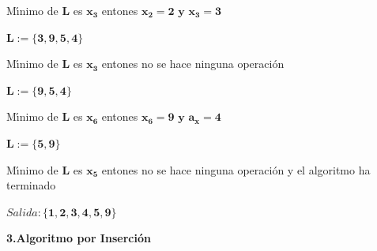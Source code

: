 \documentclass[ebook,oneside]{memoir}
\newcommand{\bolds}[1]{\boldsymbol{#1}}
\begin{document}
        \vspace*{0.5cm}

        \begin{minipage}{.6\textwidth}
        M\'{\i}nimo de $\bolds{L}$ es $\bolds{x_3}$ entones $\bolds{x_2=2
        \mbox{ y } x_3=3}$
        \end{minipage}\hfill
        \begin{minipage}{.3\textwidth}
        $\bolds{L:=\{3,9,5,4\}}$
        \end{minipage}

        \vspace*{0.5cm}

        \begin{minipage}{.6\textwidth}
        M\'{\i}nimo de $\bolds{L}$ es $\bolds{x_3}$ entones no se hace
        ninguna operaci\'{o}n
        \end{minipage}\hfill
        \begin{minipage}{.3\textwidth}
        $\bolds{L:=\{9,5,4\}}$
        \end{minipage}

        \vspace*{0.5cm}

        \begin{minipage}{.6\textwidth}
         M\'{\i}nimo de $\bolds{L}$ es $\bolds{x_6}$ entones $\bolds{x_6=9
        \mbox{ y } a_x=4}$
        \end{minipage}\hfill
        \begin{minipage}{.3\textwidth}
        $\bolds{L:=\{5,9\}}$
        \end{minipage}

        \vspace*{0.5cm}

        \begin{minipage}{.6\textwidth}
         M\'{\i}nimo de $\bolds{L}$ es $\bolds{x_5}$ entones no se hace
         ninguna operaci\'{o}n y el algoritmo ha terminado
        \end{minipage}

        \vspace*{0.5cm}

        \begin{minipage}{.6\textwidth}
        $Salida: \bolds{\{1,2,3,4,5,9\}}$
        \end{minipage}

\vspace*{0.5cm}

\textbf{3.Algoritmo por Inserci\'{o}n}
\vspace*{0.2cm}
\end{document}
